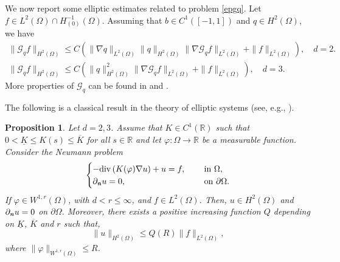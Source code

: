 \documentclass[11pt,reqno]{amsart}
\newtheorem{proposition}[theorem]{Proposition}
\theoremstyle{remark}
\def\n{\textbf{\textit{n}}}
\def\G{\mathcal{G}}
\numberwithin{equation}{section}
\begin{document}
We now report some elliptic estimates related to problem \eqref{epgq}. Let $f \in L^2(\Omega)	\cap  H^{-1}_{(0)}(\Omega)$. Assuming that $b\in C^1([-1,1])$ and $q \in H^2(\Omega)$,  we have
\begin{align}
\label{H2}
\| \mathcal{G}_{q} f\|_{H^2(\Omega)}\leq C \left( \| \nabla q\|_{L^2(\Omega)} \| q\|_{H^2(\Omega)} \| \nabla \mathcal{G}_q f\|_{L^2(\Omega)}+ \| f\|_{L^2(\Omega)} \right),  \quad d=2.
\\
\label{H2-3D}
\| \mathcal{G}_{q} f\|_{H^2(\Omega)}\leq C \left( \| q\|_{H^2(\Omega)}^2 \| \nabla \mathcal{G}_q f\|_{L^2(\Omega)}+ \| f\|_{L^2(\Omega)} \right),  \quad d=3.
\end{align}
More properties of $\G_q$ can be found in \cite{BB1999} and \cite{CGGG2025}.
\medskip

The following is a classical result in the theory of elliptic systems (see, e.g., \cite[Lemma 4]{ABELS2009}).
\begin{proposition}
\label{NP-nc}
Let $d=2,3$. Assume that $K \in C^1(\mathbb{R})$ such that
$0<\underline{K}\leq K(s)\leq \overline{K}$ for all $s \in \mathbb{R}$ and let 
$\varphi: \Omega \to \mathbb{R}$ be a measurable function.
Consider the Neumann problem
\begin{equation}
\label{NP-2}
\begin{cases}
- \mathrm{div}\, ( K(\varphi) \nabla u) + u =f,\quad &\text{ in }\Omega,\\
\partial_\n u=0, \quad &\text{ on }\partial \Omega.
\end{cases}
\end{equation}
If $\varphi \in W^{1,r}(\Omega)$, with $d<r \leq \infty$, and $f\in L^2(\Omega)$. Then, $u\in H^2(\Omega)$ and $\partial_\n u=0$ on $\partial \Omega$. Moreover, there exists a positive increasing function $Q$ depending on $\underline{K}$, $\overline{K}$ and $r$ such that,
$$
\| u\|_{H^2(\Omega)}\leq Q(R) \| f\|_{L^2(\Omega)},
$$
where $\| \varphi\|_{W^{1,r}(\Omega)}\leq R$.

\end{proposition}
\end{document}
